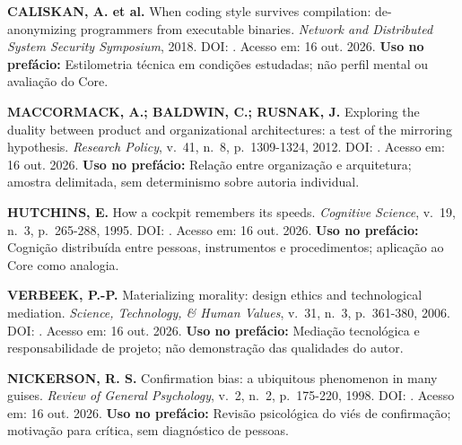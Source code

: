 \begin{referencia}
\textbf{CALISKAN, A. et al.} When coding style survives compilation: de-anonymizing programmers from executable binaries. \emph{Network and Distributed System Security Symposium}, 2018. DOI: \href{https://doi.org/10.14722/ndss.2018.23304}{}. Acesso em: 16 out. 2026.
\textbf{Uso no prefácio:} Estilometria técnica em condições estudadas; não perfil mental ou avaliação do Core.
\end{referencia}

\begin{referencia}
\textbf{MACCORMACK, A.; BALDWIN, C.; RUSNAK, J.} Exploring the duality between product and organizational architectures: a test of the mirroring hypothesis. \emph{Research Policy}, v.~41, n.~8, p.~1309-1324, 2012. DOI: \href{https://doi.org/10.1016/j.respol.2012.04.011}{}. Acesso em: 16 out. 2026.
\textbf{Uso no prefácio:} Relação entre organização e arquitetura; amostra delimitada, sem determinismo sobre autoria individual.
\end{referencia}

\begin{referencia}
\textbf{HUTCHINS, E.} How a cockpit remembers its speeds. \emph{Cognitive Science}, v.~19, n.~3, p.~265-288, 1995. DOI: \href{https://doi.org/10.1207/s15516709cog1903_1}{}. Acesso em: 16 out. 2026.
\textbf{Uso no prefácio:} Cognição distribuída entre pessoas, instrumentos e procedimentos; aplicação ao Core como analogia.
\end{referencia}

\begin{referencia}
\textbf{VERBEEK, P.-P.} Materializing morality: design ethics and technological mediation. \emph{Science, Technology, \& Human Values}, v.~31, n.~3, p.~361-380, 2006. DOI: \href{https://doi.org/10.1177/0162243905285847}{}. Acesso em: 16 out. 2026.
\textbf{Uso no prefácio:} Mediação tecnológica e responsabilidade de projeto; não demonstração das qualidades do autor.
\end{referencia}

\begin{referencia}
\textbf{NICKERSON, R. S.} Confirmation bias: a ubiquitous phenomenon in many guises. \emph{Review of General Psychology}, v.~2, n.~2, p.~175-220, 1998. DOI: \href{https://doi.org/10.1037/1089-2680.2.2.175}{}. Acesso em: 16 out. 2026.
\textbf{Uso no prefácio:} Revisão psicológica do viés de confirmação; motivação para crítica, sem diagnóstico de pessoas.
\end{referencia}

